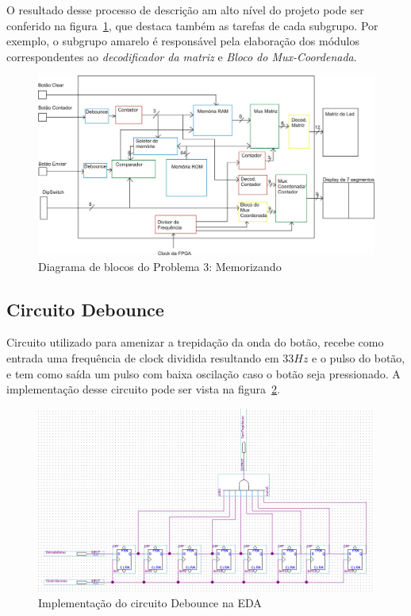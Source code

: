 \documentclass[12pt]{article}
\begin{document}
O resultado desse processo de descrição am alto nível do projeto pode ser conferido na figura~\ref{fig:diagrama}, que destaca também as tarefas de cada subgrupo. Por exemplo, o subgrupo amarelo é responsável pela elaboração dos módulos correspondentes ao \textit{decodificador da matriz} e \textit{Bloco do Mux-Coordenada}.

\begin{figure}[H]
\centering
\includegraphics[width=1\textwidth]{img/diagrama.jpg}
\caption{Diagrama de blocos do Problema 3: Memorizando}
\label{fig:diagrama}
\end{figure}



\subsection{Circuito Debounce}
Circuito utilizado para amenizar a trepidação da onda do botão, recebe como entrada uma frequência de clock dividida resultando em 33$Hz$ e o pulso do botão, e tem como saída um pulso com baixa oscilação caso o botão seja pressionado. A implementação desse circuito pode ser vista na figura~\ref{fig:debounce}.

\begin{figure}[!htbp]
\centering
\includegraphics[width=.7\textwidth]{img/debounce.png}
\caption{Implementação do circuito Debounce na EDA}
\label{fig:debounce}
\end{figure}
\end{document}
